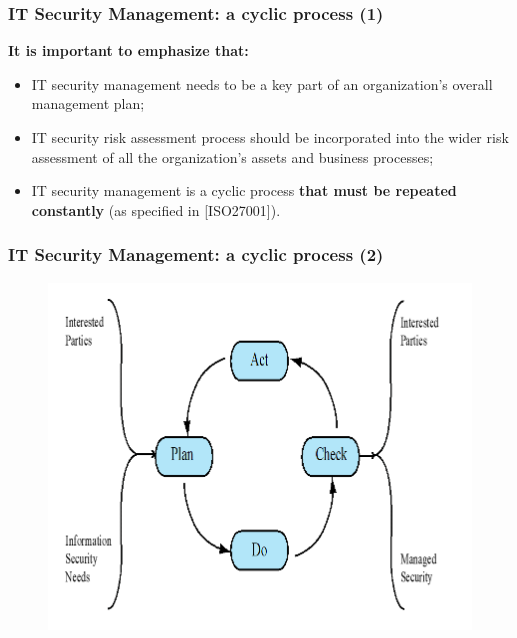 \documentclass[xcolor ={table,usenames,dvipsnames}]{beamer}
\theoremstyle{definition}
\begin{document}
	\begin{frame}
		\frametitle{IT Security Management: a cyclic process (1)}
	    \textbf{It is important to emphasize that:}
	    \begin{itemize}
	    	\item IT security management needs to be a key part of an organization’s overall management plan;
	    	\item IT security risk assessment process should be incorporated into the
	    	wider risk assessment of all the organization’s assets and business processes;
	    	\item IT security management is a cyclic process \textbf{that must be repeated constantly} (as specified in [ISO27001]).
	    \end{itemize} 
	\end{frame}
	
	\begin{frame}
		\frametitle{IT Security Management: a cyclic process (2)}
			\begin{figure}[h!]
			\centering
			\includegraphics[scale=0.50]{img/img_02.PNG}
			\label{Interfacce di un CS}
		\end{figure}
	\end{frame}
	
\end{document}
